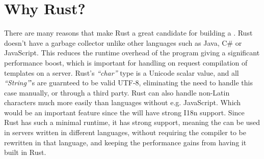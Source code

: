 \section{Why Rust?}
There are many reasons that make Rust a great candidate for building a \compiler{}. Rust doesn't have a garbage collector unlike other languages such as Java, C\# or JavaScript. This reduces the runtime overhead of the program giving a significant performance boost, which is important for handling on request compilation of templates on a server. Rust's \textit{``char''} type is a Unicode scalar value, and all \textit{``String''}'s are guarnteed to be valid UTF-8, eliminating the need to handle this case manually, or through a third party. Rust can also handle non-Latin characters much more easily than languages without e.g. JavaScript. Which would be an important feature since the \languageName{} will have strong I18n support. Since Rust has such a minimal runtime, it has strong  support, meaning the \compiler{} can be used in servers written in different languages, without requiring the compiler to be rewritten in that language, and keeping the performance gains from having it built in Rust.